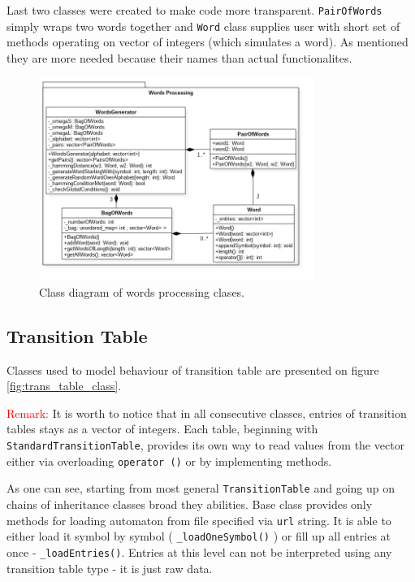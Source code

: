 \documentclass{article}
\begin{document}
Last two classes were created to make code more transparent. \texttt{PairOfWords} simply wraps two words together and \texttt{Word} class supplies user with short set of methods operating on vector of integers (which simulates a word). As mentioned they are more needed because their names than actual functionalites.

\begin{figure}[H]
	\centering
	\includegraphics[width=0.8\textwidth]{images/words_processing.jpg}
    \caption{Class diagram of words processing clases.}
    \label{fig:words_processing_class}
\end{figure}

%
%
\newpage
\subsection{Transition Table}
Classes used to model behaviour of transition table are presented on figure \ref{fig:trans_table_class}. 

\textcolor{red}{Remark:} It is worth to notice that in all consecutive classes, entries of transition tables stays as a vector of integers. Each table, beginning with \texttt{StandardTransitionTable}, provides its own way to read values from the vector either via overloading \texttt{operator ()} or by implementing methods.

As one can see, starting from most general \texttt{TransitionTable} and going up on chains of inheritance classes broad they abilities. Base class provides only methods for loading automaton from file specified via \texttt{url} string. It is able to either load it symbol by symbol ( \texttt{\_loadOneSymbol()} ) or fill up all entries at once - \texttt{\_loadEntries()}. Entries at this level can not be interpreted using any transition table type - it is just raw data.
\end{document}
